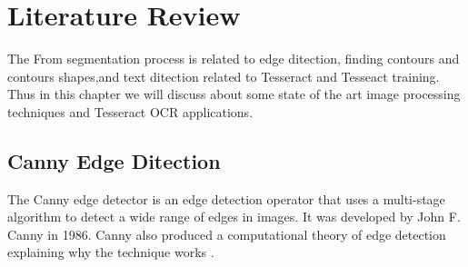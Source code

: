 \chapter {Literature Review}
\label{literature_review}
The From segmentation process is related to edge ditection, finding contours and contours shapes,and text ditection related to Tesseract and Tesseact training. Thus in this chapter we will discuss about some state of the art image processing techniques and Tesseract OCR applications.
\section{Canny Edge Ditection}
\label{EdgeDitectionR}
The Canny edge detector is an edge detection operator that uses a multi-stage algorithm to detect a wide range of edges in images. It was developed by John F. Canny in 1986. Canny also produced a computational theory of edge detection explaining why the technique works \cite{EdgeDetection} \cite{CannyEdgeDetection3}.
